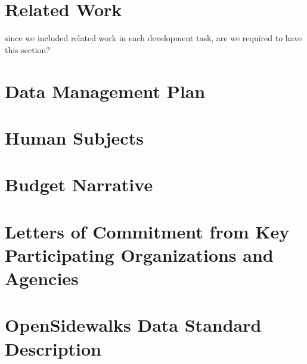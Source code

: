 \documentclass[12pt,letterpaper]{article}
\newcommand{\ac}[1]{{\color{red}#1}}
\begin{document}
\section{Related Work}
\ac{since we included related work in each development task, are we required to have this section?}
%

\renewcommand{\thepage}{}
\begin{appendices}
\section{Data Management Plan}

\section{Human Subjects}

\section{Budget Narrative}
\label{budget}

\section{Letters of Commitment from Key Participating Organizations and Agencies}

\section{OpenSidewalks Data Standard Description}

\end{appendices}

\pagebreak



\end{document}

